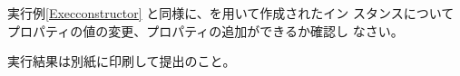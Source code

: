 \begin{Prob}\upshape\Must
 実行例\else\ref{Execconstructor}\fi
 と同様に、を用いて作成されたイン
 スタンスについてプロパティの値の変更、プロパティの追加ができるか確認し
 なさい。
\end{Prob}
\ifText
実行結果は別紙に印刷して提出のこと。
\fi